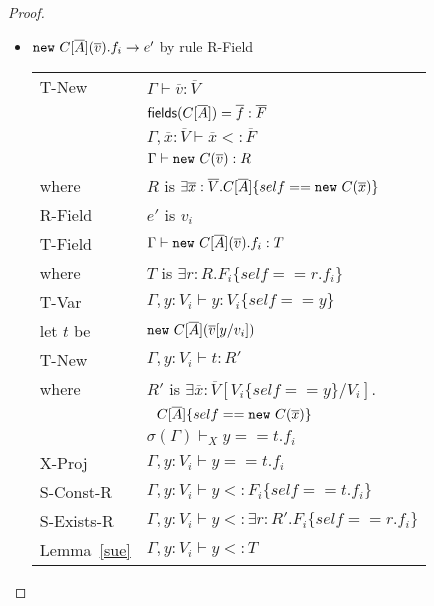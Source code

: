 \begin{proof}
\begin{itemize}
\item ${\tt new}~C[\overline{A}](\overline{v}).f_i \rightarrow e'$ by rule {\sc R-Field}
\\
\begin{tabular}{ll}
{\sc T-New} & $\Gamma\vdash\overline{v}:\overline{V}$
\\
& ${\sf fields}(C[\overline{A}])=\overline{f}:\overline{F}$
\\
& $\Gamma,\overline{x}:\overline{V}\vdash \overline{x}<:\overline{F}$
\\
& $\Gamma\vdash{\tt new}~C(\overline{v}):R$
\\
where & $R$ is $\exists\overline{x}:\overline{V}.C[\overline{A}]\{self=={\tt new}~C(\overline{x})\}$
\\
{\sc R-Field} & $e'$ is $v_i$
\\
{\sc T-Field} &
$\Gamma\vdash{\tt new}~C[\overline{A}](\overline{v}).f_i:T$ \\
where & $T$ is $\exists r:R.F_i\{self==r.f_i\}$
\\
{\sc T-Var} & $\Gamma,y:V_i\vdash y:V_i\{self==y\}$
\\
let $t$ be & ${\tt new}~C[\overline{A}](\overline{v}[y/v_i])$
\\
{\sc T-New} & $\Gamma,y:V_i\vdash t:R'$
\\
where & $R'$ is $\exists\overline{x}:\overline{V}[V_i\{self==y\}/V_i].$\\
& $~~C[\overline{A}]\{self=={\tt new}~C(\overline{x})\}$
\\
 & $\sigma(\Gamma)\vdash_X y==t.f_i$
\\
{\sc X-Proj} & $\Gamma,y:V_i\vdash y==t.f_i$
\\
{\sc S-Const-R} & $\Gamma,y:V_i\vdash y<:F_i\{self==t.f_i\}$
\\
{\sc S-Exists-R} & $\Gamma,y:V_i\vdash y<:\exists r:R'.F_i\{self==r.f_i\}$
\\
Lemma~\ref{sue} & $\Gamma,y:V_i\vdash y<:T$
\end{tabular}



\end{itemize}
\end{proof}
